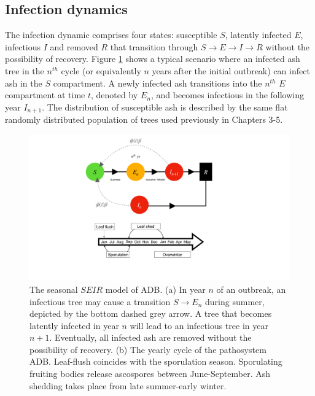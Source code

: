 \subsection{Infection dynamics}
\label{sec:infection-dynamics}

The infection dynamic comprises four states: susceptible $S$, latently infected $E$, infectious $I$ and removed $R$
that transition through $S\rightarrow E \rightarrow I \rightarrow R$ without the possibility of recovery.  
Figure \ref{fig:SEIR-transitions} shows a typical scenario where an infected ash tree in the $n^{th}$ cycle (or equivalently $n$ 
years after the initial outbreak) can infect ash in the $S$ compartment. A newly infected ash transitions into the $n^{th}$ $E$ compartment at time $t$, 
denoted by $E_n$, and becomes infectious in the following year $I_{n+1}$. The distribution of susceptible ash is described by 
the same flat randomly distributed population of trees used previously in Chapters 3-5.

\begin{figure}
    \centering
    \includegraphics[scale=0.40]{chapter6/figures/fig1-seir-transitions.pdf}
    \caption{The seasonal $SEIR$ model of ADB. (a) In year $n$ of an outbreak, an infectious tree may cause a transition $S\rightarrow E_n$ during summer, 
             depicted by the bottom dashed grey arrow. A tree that becomes latently infected in year $n$ will lead to an infectious tree in year $n+1$. 
             Eventually, all infected ash are removed without the possibility of recovery. 
             (b) The yearly cycle of the pathosystem ADB. Leaf-flush coincides with the sporulation season. 
             Sporulating fruiting bodies release ascospores between June-September. Ash shedding takes place from late summer-early winter.}
    \label{fig:SEIR-transitions}
\end{figure}

